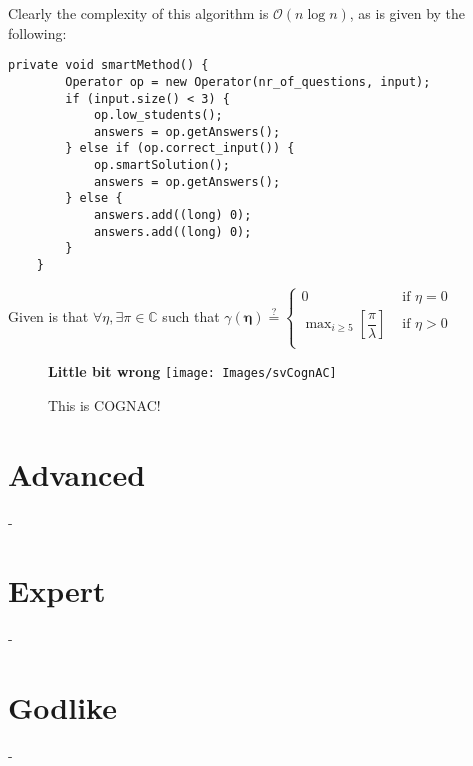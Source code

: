 \documentclass[hidelinks]{article}
\begin{document}
Clearly the complexity of this algorithm is $\mathcal{O}\left(n\log n\right)$, as is given by the following:

\begin{lstlisting}[frame=single]
    private void smartMethod() {
        Operator op = new Operator(nr_of_questions, input);
        if (input.size() < 3) {
            op.low_students();
            answers = op.getAnswers();
        } else if (op.correct_input()) {
            op.smartSolution();
            answers = op.getAnswers();
        } else {
            answers.add((long) 0);
            answers.add((long) 0);
        }
    }
\end{lstlisting}

Given is that $\forall\eta,\exists\pi\in\mathbb{C}$ such that $\gamma(\boldsymbol{\eta}) \stackrel{?}{=}
\begin{cases}
	0 & \text{ if } \eta=0\\
	\displaystyle\max_{i\geq5}\left[\dfrac{\pi}{\lambda}\right] & \text{ if }\eta>0\\
\end{cases}$

\begin{figure}[H]
	\textbf{Little bit wrong}
	\centering
	\texttt{[image: Images/svCognAC]}
	\caption{This is COGNAC!}
\end{figure}

\clearpage

\section*{Advanced}
-

\clearpage

\section*{Expert}
-

\clearpage

\section*{Godlike}
-

\clearpage
\end{document}
